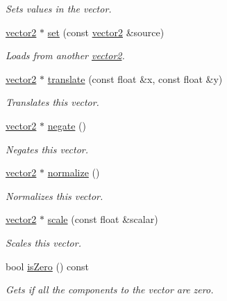 \begin{DoxyCompactItemize}
\begin{DoxyCompactList}\small\item\em Sets values in the vector. \end{DoxyCompactList}\item 
\hyperlink{classflounder_1_1vector2}{vector2} $\ast$ \hyperlink{classflounder_1_1vector2_a4b553633e18fa6aafc1a5407fcf1e502}{set} (const \hyperlink{classflounder_1_1vector2}{vector2} \&source)
\begin{DoxyCompactList}\small\item\em Loads from another \hyperlink{classflounder_1_1vector2}{vector2}. \end{DoxyCompactList}\item 
\hyperlink{classflounder_1_1vector2}{vector2} $\ast$ \hyperlink{classflounder_1_1vector2_a8795f9c2519a2b0e3da92a06d57e7678}{translate} (const float \&x, const float \&y)
\begin{DoxyCompactList}\small\item\em Translates this vector. \end{DoxyCompactList}\item 
\hyperlink{classflounder_1_1vector2}{vector2} $\ast$ \hyperlink{classflounder_1_1vector2_a0fa7eef12302eaa8cd4f4ff030231e3d}{negate} ()
\begin{DoxyCompactList}\small\item\em Negates this vector. \end{DoxyCompactList}\item 
\hyperlink{classflounder_1_1vector2}{vector2} $\ast$ \hyperlink{classflounder_1_1vector2_a6b47b4d4a39f7a3465e03ee74299ebbe}{normalize} ()
\begin{DoxyCompactList}\small\item\em Normalizes this vector. \end{DoxyCompactList}\item 
\hyperlink{classflounder_1_1vector2}{vector2} $\ast$ \hyperlink{classflounder_1_1vector2_a06efaa630c89a81cda8a8d9d6552e9f8}{scale} (const float \&scalar)
\begin{DoxyCompactList}\small\item\em Scales this vector. \end{DoxyCompactList}\item 
bool \hyperlink{classflounder_1_1vector2_a70c97ee15f7a9a6e47916bd86e76f42b}{is\+Zero} () const
\begin{DoxyCompactList}\small\item\em Gets if all the components to the vector are zero. \end{DoxyCompactList}\item 

\end{DoxyCompactItemize}
